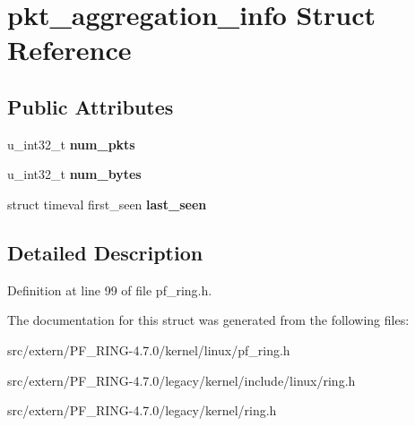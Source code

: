 \hypertarget{structpkt__aggregation__info}{
\section{pkt\_\-aggregation\_\-info Struct Reference}
\label{structpkt__aggregation__info}
}
\subsection*{Public Attributes}
\begin{DoxyCompactItemize}
\item 
\hypertarget{structpkt__aggregation__info_a8ec592faa5436133f8017f198420926b}{
u\_\-int32\_\-t {\bfseries num\_\-pkts}}
\label{structpkt__aggregation__info_a8ec592faa5436133f8017f198420926b}

\item 
\hypertarget{structpkt__aggregation__info_a91d01e62a87c72fbdab6c47784a06141}{
u\_\-int32\_\-t {\bfseries num\_\-bytes}}
\label{structpkt__aggregation__info_a91d01e62a87c72fbdab6c47784a06141}

\item 
\hypertarget{structpkt__aggregation__info_a7cf2a032a8069651cd5a14c8a4bd9ea7}{
struct timeval first\_\-seen {\bfseries last\_\-seen}}
\label{structpkt__aggregation__info_a7cf2a032a8069651cd5a14c8a4bd9ea7}

\end{DoxyCompactItemize}


\subsection{Detailed Description}


Definition at line 99 of file pf\_\-ring.h.



The documentation for this struct was generated from the following files:\begin{DoxyCompactItemize}
\item 
src/extern/PF\_\-RING-\/4.7.0/kernel/linux/pf\_\-ring.h\item 
src/extern/PF\_\-RING-\/4.7.0/legacy/kernel/include/linux/ring.h\item 
src/extern/PF\_\-RING-\/4.7.0/legacy/kernel/ring.h\end{DoxyCompactItemize}
